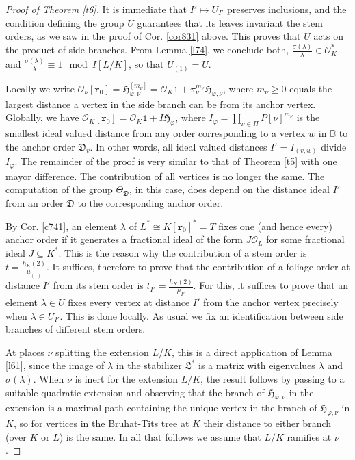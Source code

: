 \documentclass{article}
\theoremstyle{definition}
\theoremstyle{remark}
\begin{document}
\begin{proof}[Proof of Theorem \ref{t6}]
It is immediate that $I'\mapsto U_{I'}$
preserves inclusions, and the condition
defining the group $U$ guarantees
that its leaves invariant the stem orders,
as we saw in the proof of 
Cor. \ref{cor831} above.
This proves that $U$ acts on the product
of side branches.
From Lemma \ref{l74}, we conclude both,
$\frac{\sigma(\lambda)}\lambda\in\mathcal{O}_K^*$ and
$\frac{\sigma(\lambda)}\lambda\equiv1\mod I[L/K]$, 
so that $U_{(1)}=U$.

Locally we write 
$\mathcal{O}_\nu[\mathtt{r}_0]=
\mathfrak{H}_{\varphi,\nu}^{[m_\nu]}=
\mathcal{O}_K\mathtt{1}+\pi_\nu^{m_\nu}
\mathfrak{H}_{\varphi,\nu}$,
where $m_\nu\geq 0$ equals the largest distance
a vertex in the side branch can be from its anchor vertex. 
Globally, we have $\mathcal{O}_K[\mathtt{r}_0]=
\mathcal{O}_K\mathtt{1}+I\mathfrak{H}_\varphi$, 
where $I_\varphi=
\prod_{\nu\in\Pi}P[\nu]^{m_\nu}$
is the smallest ideal valued distance from 
any order corresponding to a vertex $w$ in 
$\mathbb{B}$ to the anchor order 
$\mathfrak{D}_v$. In other words,
all ideal valued distances $I'=I_{(v,w)}$ divide $I_\varphi$. 
The remainder of the proof is very similar to
that of Theorem \ref{t5} with one mayor difference. 
The contribution of all vertices
is no longer the same. The computation of
the group $\Theta_{\mathfrak{D}}$, in this case,
does depend on the distance ideal $I'$
from an order $\mathfrak{D}$ to the 
corresponding anchor order. 

By Cor. \ref{c741}, an element $\lambda$ of 
$L^*\cong K[\mathtt{r}_0]^*=T$ fixes one (and 
hence every) anchor order if it generates a 
fractional ideal of the 
form $J\mathcal{O}_L$ 
for some fractional ideal $J\subseteq K^*$. 
This is the reason why the contribution of
a stem order is $t=\frac{h_K(2)}{\mu_{(1)}}$.
It suffices, therefore to prove that the contribution
of a foliage order at distance $I'$ from its stem order
is $t_{I'}=\frac{h_K(2)}{\mu_{I'}}$. For this, it
suffices to prove that an element $\lambda\in U$
fixes every vertex at distance $I'$ from the anchor vertex
precisely when $\lambda\in U_{I'}$. This is done locally.
As usual we fix an identification between side branches
of different stem orders.

At places $\nu$ splitting the extension $L/K$, this is a direct 
application of Lemma \ref{l61}, since the image of 
$\lambda$ in the stabilizer $\mathfrak{L}^*$
is a matrix with eigenvalues $\lambda$ and $\sigma(\lambda)$. 
 When $\nu$ is inert for the 
extension $L/K$, the result follows by passing to a suitable quadratic 
extension and observing that the branch of $\mathfrak{H}_{\varphi,\nu}$
in the extension is a maximal path containing the unique vertex
in the branch of $\mathfrak{H}_{\varphi,\nu}$ in $K$, so for
vertices in the Bruhat-Tits tree at $K$ their distance to either
branch (over $K$ or $L$) is the same. In all that follows we assume 
that $L/K$ ramifies at $\nu$. 


\end{proof}
\end{document}
